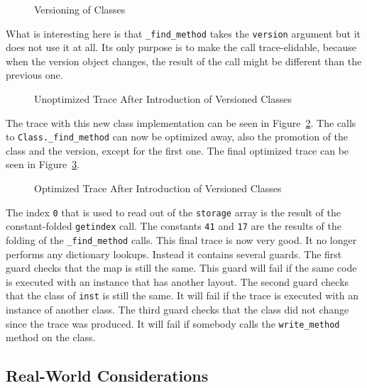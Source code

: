 \documentclass{sigplanconf}
\begin{document}
\begin{figure}

\caption{Versioning of Classes}
\label{fig:version}
\end{figure}

What is interesting here is that \texttt{\_find\_method} takes the \texttt{version}
argument but it does not use it at all. Its only purpose is to make the call
trace-elidable, because when the version object changes, the result of the call might be
different than the previous one.

\begin{figure}

\caption{Unoptimized Trace After Introduction of Versioned Classes}
\label{fig:trace4}
\end{figure}

The trace with this new class implementation can be seen in
Figure~\ref{fig:trace4}.
The calls to \texttt{Class.\_find\_method} can now be optimized away, also the
promotion of the class and the version, except for the first one. The final
optimized trace can be seen in Figure~\ref{fig:trace5}.

\begin{figure}

\caption{Optimized Trace After Introduction of Versioned Classes}
\label{fig:trace5}
\end{figure}

The index \texttt{0} that is used to read out of the \texttt{storage} array is the result
of the constant-folded \texttt{getindex} call.
The constants \texttt{41} and \texttt{17} are the results of the folding of the
\texttt{\_find\_method} calls. This final trace is now very good. It no longer performs any
dictionary lookups. Instead it contains several guards. The first guard
checks that the map is still the same. This guard will fail if the same
code is executed with an instance that has another layout. The second guard
checks that the class of \texttt{inst} is still the same. It will fail if the trace is
executed with an instance of another class. The third guard checks that the
class did not change since the trace was produced. It will fail if somebody
calls the \texttt{write\_method} method on the class.


\subsection{Real-World Considerations}
\end{document}
